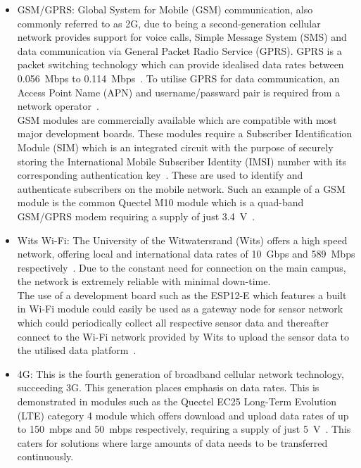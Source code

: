 \documentclass[10pt,twocolumn]{witseiepaper}
\begin{document}
			\begin{itemize}
				
				\item GSM/GPRS:
				Global System for Mobile (GSM) communication, also commonly referred to as 2G, due to being a second-generation cellular network provides support for voice calls, Simple Message System (SMS) and data communication via General Packet Radio Service (GPRS). GPRS is a packet switching technology which can provide idealised data rates between 0.056~Mbps to 0.114~Mbps~\cite{gprs}. To utilise GPRS for data communication, an Access Point Name (APN) and username/passward pair is required from a network operator~\cite{gprs}.\\
				
				GSM modules are commercially available which are compatible with most major development boards. These modules require a Subscriber Identification Module (SIM) which is an integrated circuit with the purpose of securely storing the International Mobile Subscriber Identity (IMSI) number with its corresponding authentication key~\cite{imsi}. These are used to identify and authenticate subscribers on the mobile network. Such an example of a GSM module is the common Quectel M10 module which is a quad-band GSM/GPRS modem requiring a supply of just 3.4~V~\cite{m10}.\\

				\item Wits Wi-Fi:
				The University of the Witwatersrand (Wits) offers a high speed network, offering local and international data rates of 10~Gbps and 589~Mbps respectively~\cite{wits-speed}. Due to the constant need for connection on the main campus, the network is extremely reliable with minimal down-time.\\
				
				The use of a development board such as the ESP12-E which features a built in Wi-Fi module could easily be used as a gateway node for sensor network which could periodically collect all respective sensor data and thereafter connect to the Wi-Fi network provided by Wits to upload the sensor data to the utilised data platform~\cite{esp12e}.\\
			
				\item 4G:
				This is the fourth generation of broadband cellular network technology, succeeding 3G. This generation places emphasis on data rates. This is demonstrated in modules such as the Quectel EC25 Long-Term Evolution (LTE) category 4 module which offers download and upload data rates of up to 150~mbps and 50~mbps respectively, requiring a supply of just 5~V~\cite{ec25}. This caters for solutions where large amounts of data needs to be transferred continuously.

			\end{itemize}
\end{document}
